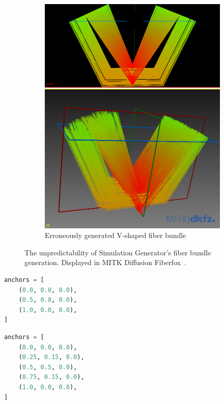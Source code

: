 \documentclass{article}
\begin{document}
\begin{figure}[!h]
\begin{subfigure}[b]{0.4\textwidth}
      \includegraphics[width=\textwidth]{sim_gen__v_shape__bad}
      \caption{Erroneously generated V-shaped fiber bundle}
      \label{fig:f1-b}
    \end{subfigure}
    \caption{The unpredictability of Simulation Generator's fiber bundle generation. Displayed in MITK Diffusion Fiberfox~\cite{neher2014fiberfox}.}
    \label{fig:f1}
  \end{figure}

  \begin{lstlisting}[language=Python,caption={Centroid anchors of the Figure~\ref{fig:f1-a}},label={lst:f1-a}]
anchors = [
    (0.0, 0.0, 0.0),
    (0.5, 0.8, 0.0),
    (1.0, 0.0, 0.0),
]\end{lstlisting}

  \begin{lstlisting}[language=Python,caption={Centroid anchors of the Figure~\ref{fig:f1-b}},label={lst:f1-b}]
anchors = [
    (0.0, 0.0, 0.0),
    (0.25, 0.15, 0.0),
    (0.5, 0.5, 0.0),
    (0.75, 0.15, 0.0),
    (1.0, 0.0, 0.0),
]\end{lstlisting}
\end{document}
